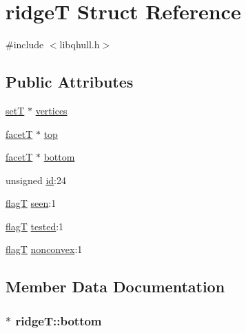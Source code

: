 \hypertarget{structridgeT}{}\section{ridge\+T Struct Reference}
\label{structridgeT}


{\ttfamily \#include $<$libqhull.\+h$>$}

\subsection*{Public Attributes}
\begin{DoxyCompactItemize}
\item 
\hyperlink{structsetT}{set\+T} $\ast$ \hyperlink{structridgeT_a9d3268fe3320b46b5170631f469dd0b4}{vertices}
\item 
\hyperlink{structfacetT}{facet\+T} $\ast$ \hyperlink{structridgeT_a3b9ae7ff413008ed39136e9531226333}{top}
\item 
\hyperlink{structfacetT}{facet\+T} $\ast$ \hyperlink{structridgeT_a20fb1c75147a69df64532ca47dcdd137}{bottom}
\item 
unsigned \hyperlink{structridgeT_a9e79081429d2ace26e6c2394f277d0d5}{id}\+:24
\item 
\hyperlink{libqhull_8h_a0ff81862a2ab15dc96eb3803685cda2d}{flag\+T} \hyperlink{structridgeT_a057f291d6707318280f6f82a13141585}{seen}\+:1
\item 
\hyperlink{libqhull_8h_a0ff81862a2ab15dc96eb3803685cda2d}{flag\+T} \hyperlink{structridgeT_a7a4a3d44636a4e66c43312ffcba096bc}{tested}\+:1
\item 
\hyperlink{libqhull_8h_a0ff81862a2ab15dc96eb3803685cda2d}{flag\+T} \hyperlink{structridgeT_a7f44e0100bccfa83f12702a3aabe7393}{nonconvex}\+:1
\end{DoxyCompactItemize}


\subsection{Member Data Documentation}
\hypertarget{structridgeT_a20fb1c75147a69df64532ca47dcdd137}{}
\subsubsection[{bottom}]{$\ast$ ridge\+T\+::bottom}\label{structridgeT_a20fb1c75147a69df64532ca47dcdd137}
\hypertarget{structridgeT_a9e79081429d2ace26e6c2394f277d0d5}{}
